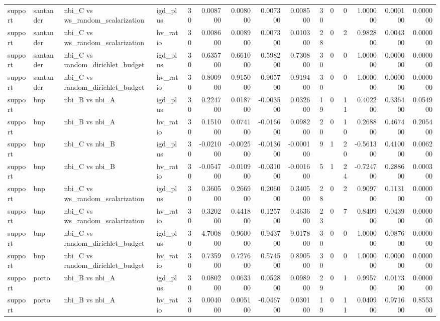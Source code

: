 \begin{landscape}
\begin{longtable}{llllrrrrrrrrrrr}
support & santander & nbi\_C vs ws\_random\_scalarization & igd\_plus & 30 & 0.008700 & 0.008000 & 0.007300 & 0.008500 & 30 & 0 & 0 & 1.000000 & 0.000100 & 0.000000 \\
support & santander & nbi\_C vs ws\_random\_scalarization & hv\_ratio & 30 & 0.008600 & 0.008900 & 0.007300 & 0.010300 & 28 & 0 & 2 & 0.982800 & 0.004300 & 0.000000 \\
support & santander & nbi\_C vs random\_dirichlet\_budget & igd\_plus & 30 & 0.635700 & 0.661000 & 0.598200 & 0.730800 & 30 & 0 & 0 & 1.000000 & 0.000000 & 0.000000 \\
support & santander & nbi\_C vs random\_dirichlet\_budget & hv\_ratio & 30 & 0.800900 & 0.915000 & 0.905700 & 0.919400 & 30 & 0 & 0 & 1.000000 & 0.000000 & 0.000000 \\
support & bnp & nbi\_B vs nbi\_A & igd\_plus & 30 & 0.224700 & 0.018700 & -0.003500 & 0.032600 & 19 & 0 & 11 & 0.402200 & 0.336400 & 0.054900 \\
support & bnp & nbi\_B vs nbi\_A & hv\_ratio & 30 & 0.151000 & 0.074100 & -0.016600 & 0.098200 & 20 & 0 & 10 & 0.268800 & 0.467400 & 0.205400 \\
support & bnp & nbi\_C vs nbi\_B & igd\_plus & 30 & -0.021000 & -0.002500 & -0.013600 & -0.000100 & 9 & 1 & 20 & -0.561300 & 0.410000 & 0.006200 \\
support & bnp & nbi\_C vs nbi\_B & hv\_ratio & 30 & -0.054700 & -0.010900 & -0.031000 & -0.001600 & 5 & 1 & 24 & -0.724700 & 0.288600 & 0.000300 \\
support & bnp & nbi\_C vs ws\_random\_scalarization & igd\_plus & 30 & 0.360500 & 0.266900 & 0.206000 & 0.340500 & 28 & 0 & 2 & 0.909700 & 0.113100 & 0.000000 \\
support & bnp & nbi\_C vs ws\_random\_scalarization & hv\_ratio & 30 & 0.320200 & 0.441800 & 0.125700 & 0.463600 & 23 & 0 & 7 & 0.840900 & 0.043900 & 0.000000 \\
support & bnp & nbi\_C vs random\_dirichlet\_budget & igd\_plus & 30 & 4.700800 & 0.960000 & 0.943700 & 9.017800 & 30 & 0 & 0 & 1.000000 & 0.087600 & 0.000000 \\
support & bnp & nbi\_C vs random\_dirichlet\_budget & hv\_ratio & 30 & 0.735900 & 0.727600 & 0.574500 & 0.890500 & 30 & 0 & 0 & 1.000000 & 0.000000 & 0.000000 \\
support & porto & nbi\_B vs nbi\_A & igd\_plus & 30 & 0.080200 & 0.063300 & 0.052800 & 0.098900 & 29 & 0 & 1 & 0.995700 & 0.017300 & 0.000000 \\
support & porto & nbi\_B vs nbi\_A & hv\_ratio & 30 & 0.004000 & 0.005100 & -0.046700 & 0.030100 & 19 & 0 & 11 & 0.040900 & 0.971600 & 0.855300 \\

\end{longtable}
\end{landscape}
